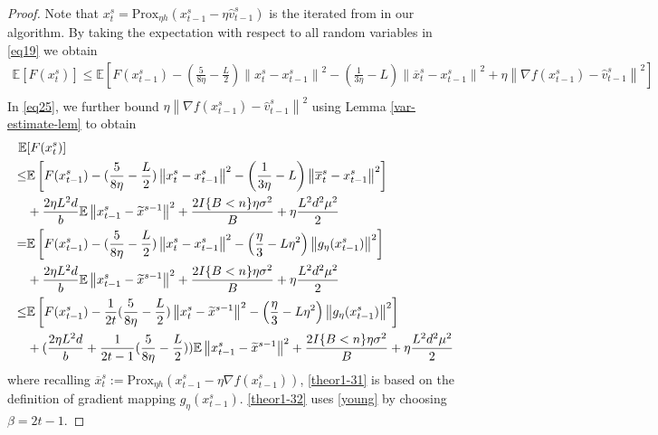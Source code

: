 \documentclass{article}
\newcommand*{\Po}{\text{Prox}}
\newcommand*{\E}{\mathbb{E}}
\newcommand{\norm}[1]{\left\lVert#1\right\rVert}
\theoremstyle{definition}
\theoremstyle{remark}
\begin{document}
\begin{proof}
Note that $x_t^s = \Po_{\eta h}(x_{t-1}^s - \eta \hat{v}_{t-1}^s)$ is the iterated from in our algorithm.  By taking the expectation with respect to all random variables in \eqref{eq19} we obtain
 \begin{equation}\label{eq25}
 \begin{split} 
\E[F({x}_{t}^s)] \leq \E\left[F({x}_{t-1}^s)  -(\frac{5}{8\eta} - \frac{L}{2})\norm{{x}_t^s-x_{t-1}^s}^2- \left(\frac{1}{3\eta}-L\right)\norm{\overline{x}_t^s-x_{t-1}^s}^2+\eta \norm{\nabla f(x_{t-1}^s)-\hat{v}_{t-1}^s}^2\right]\\
 \end{split}
 \end{equation}
In \eqref{eq25}, we further bound $\eta \norm{\nabla f(x_{t-1}^s)-\hat{v}_{t-1}^s}^2$ using Lemma \ref{var-estimate-lem} to obtain
 \begin{align} 
\E&[F({x}_{t}^s)] \notag
\notag
\\ \leq& \E\left[F({x}_{t-1}^s)  -(\frac{5}{8\eta} - \frac{L}{2})\norm{{x}_t^s-x_{t-1}^s}^2- \left(\frac{1}{3\eta}-L\right)\norm{\overline{x}_t^s-x_{t-1}^s}^2\right]\notag\\
&+ \frac{2\eta L^2 d}{b}\E\norm{x_{t-1}^s-\widetilde{x}^{s-1}}^2 + \frac{2I\{B < n\}\eta \sigma ^2}{B}+\eta \frac{L^2 d^2 \mu^2}{2}\notag
\\ =& \E\left[F({x}_{t-1}^s)  -(\frac{5}{8\eta} - \frac{L}{2})\norm{{x}_t^s-x_{t-1}^s}^2- \left(\frac{\eta}{3}-L\eta^2\right)\norm{g_{\eta}(x_{t-1}^s)}^2\right]\notag
\\&+\frac{2\eta L^2 d}{b}\E\norm{x_{t-1}^s-\widetilde{x}^{s-1}}^2+ \frac{2I\{B < n\}\eta \sigma ^2}{B}+\eta \frac{L^2 d^2 \mu^2}{2}\label{theor1-31}
\\ \leq& \E\left[F({x}_{t-1}^s)  -\frac{1}{2t}(\frac{5}{8\eta} - \frac{L}{2})\norm{{x}_t^s-\widetilde{x}^{s-1}}^2- \left(\frac{\eta}{3}-L\eta^2\right)\norm{g_{\eta}(x_{t-1}^s)}^2\right]\notag\\
&+(\frac{2\eta L^2 d}{b}+\frac{1}{2t-1}(\frac{5}{8\eta} - \frac{L}{2}))\E\norm{x_{t-1}^s-\widetilde{x}^{s-1}}^2
+ \frac{2I\{B < n\}\eta \sigma ^2}{B}+\eta \frac{L^2 d^2 \mu^2}{2}\label{theor1-32}
 \end{align}
where recalling $\overline{x}_t^s := \Po_{\eta h}(x_{t-1}^s - \eta \nabla f(x_{t-1}^s))$, \eqref{theor1-31}  is based on the definition of gradient mapping $g_{\eta}(x_{t-1}^s)$. \eqref{theor1-32} uses \eqref{young} by choosing $\beta = 2t-1$.
 

\end{proof}
\end{document}
